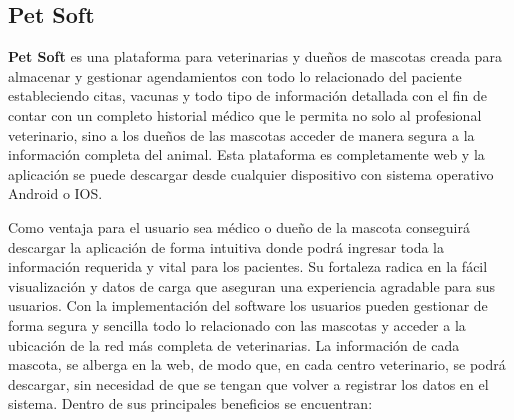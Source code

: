 \subsection{Pet Soft}\label{chapter:introduction}




\textbf{ Pet Soft}  es una plataforma para veterinarias y dueños de mascotas creada para almacenar y gestionar agendamientos con todo lo relacionado del paciente estableciendo citas, vacunas y todo tipo de información detallada con el fin de contar con un completo historial médico que le permita no solo al profesional veterinario, sino a los dueños de las mascotas acceder de manera segura a la información completa del animal. Esta plataforma es completamente web y la aplicación se puede descargar desde cualquier dispositivo con sistema operativo Android o IOS.

Como ventaja para el usuario sea médico o dueño de la mascota conseguirá descargar la aplicación de forma intuitiva donde podrá ingresar toda la información requerida y vital para los pacientes. Su fortaleza radica en la fácil visualización y datos de carga que aseguran una experiencia agradable para sus usuarios. Con la implementación del software los usuarios pueden gestionar de forma segura y sencilla todo lo relacionado con las mascotas y acceder a la ubicación de la red más completa de veterinarias. La información de cada mascota, se alberga en la web, de modo que, en cada centro veterinario, se podrá descargar, sin necesidad de que se tengan que volver a registrar los datos en el sistema. Dentro de sus principales beneficios se encuentran:

